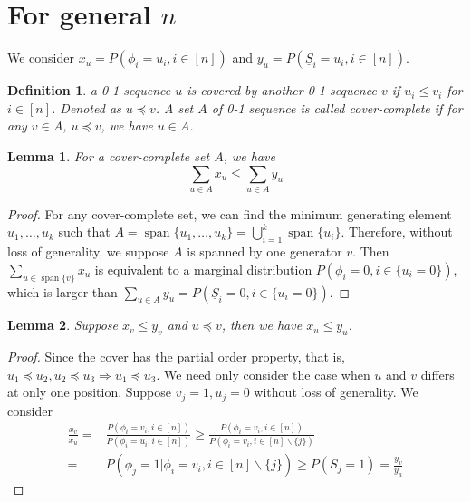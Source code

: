 \documentclass{article}
\DeclareMathOperator{\myspan}{span}
\newtheorem{lemma}{Lemma}
\newtheorem{definition}{Definition}
\begin{document}
\section{For general $n$}
We consider $x_u = P(\phi_i = u_i, i\in [n])$ and
$y_u = P(\underline{S}_i = u_i, i\in [n])$.
\begin{definition}
a 0-1 sequence $u$ is covered by another 0-1 sequence $v$ if $u_i \leq v_i$ for $i \in [n]$. Denoted as
$u \preceq v$.
A set $A$ of 0-1 sequence is called cover-complete if for any $v \in A$, $u \preceq v$, we have $u \in A$.

\end{definition}
\begin{lemma}\label{lem:coverA}
For a cover-complete set $A$, we have
\begin{equation}
    \sum_{u \in A} x_u \leq \sum_{u \in A} y_u
\end{equation}
\end{lemma}
\begin{proof}
For any cover-complete set, we can find the minimum
generating element $u_1, \dots, u_k$ such that
$A = \myspan\{u_1, \dots, u_k\} = \bigcup_{i=1}^k \myspan\{u_i\}$. Therefore, without loss of
generality, we suppose $A$ is spanned by one generator
$v$. Then $\sum_{u \in \myspan\{v\}} x_u$ is
equivalent to a marginal distribution $P(\phi_i = 0 ,i \in \{u_i = 0\})$, which is larger than $\sum_{u\in A}y_u = P(\underline{S}_i = 0 ,i \in \{u_i = 0\}) $.
\end{proof}
\begin{lemma}\label{lem2}
Suppose $x_v \leq y_v$ and $u \preceq v$, then we have
$x_u \leq y_u$.
\end{lemma}
\begin{proof}
Since the cover has the partial order property,
that is, $u_1 \preceq u_2, u_2 \preceq u_3 \Rightarrow u_1 \preceq u_3$. We need only
consider the case when $u$ and $v$ differs at
only one position. Suppose $v_j=1, u_j=0$ without
loss of generality.
We consider 
\begin{align*}
\frac{x_v}{x_u}
=& \frac{P(\phi_i = v_i, i \in [n])}
{P(\phi_i = u_i, i\in [n])}
\geq \frac{P(\phi_i = v_i, i \in [n])}
{P(\phi_i = v_i, i \in [n]\backslash\{j\})} \\
=& P(\phi_j = 1 | \phi_i = v_i, i \in [n]\backslash\{j\}) \geq P(S_j = 1) = \frac{y_v}{y_u}
\end{align*}
\end{proof}
\end{document}
